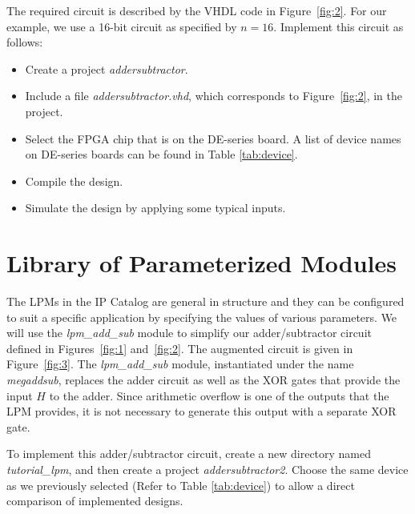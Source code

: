 \documentclass[11pt, twoside, pdftex]{article}
\begin{document}
 
The required circuit is described by the VHDL code in Figure~\ref{fig:2}.
For our example, we use a 16-bit circuit as specified by $n = 16$.
Implement this circuit as follows:
\begin{itemize}
\item Create a project {\it addersubtractor}.
\item Include a file {\it addersubtractor.vhd}, which corresponds to Figure~\ref{fig:2},
in the project. 
\item Select the FPGA chip that is on the DE-series board. A list of device names on DE-series boards can be found in Table \ref{tab:device}.
\item Compile the design.
\item Simulate the design by applying some typical inputs.
\end{itemize}

\newpage

\newpage

\newpage
\section{Library of Parameterized Modules}

The LPMs in the IP Catalog are general in structure 
and they can be configured to suit a specific
application by specifying the values of various parameters.
We will use the {\it lpm\_add\_sub} module to simplify our 
adder/subtractor circuit defined in Figures~\ref{fig:1} and~\ref{fig:2}.
The augmented circuit is given in Figure~\ref{fig:3}. The {\it lpm\_add\_sub} module,
instantiated under the name {\it megaddsub},
replaces the adder circuit as well as the XOR gates that provide the input $H$
to the adder. Since arithmetic overflow is one of the outputs that the LPM
provides, it is not necessary to generate this output with a separate XOR gate.

To implement this adder/subtractor circuit, create a new directory named
{\it tutorial\_lpm}, and then create a project {\it addersubtractor2}.
Choose the same device as we previously selected (Refer to Table \ref{tab:device}) 
to allow a direct comparison of implemented designs.
\end{document}
